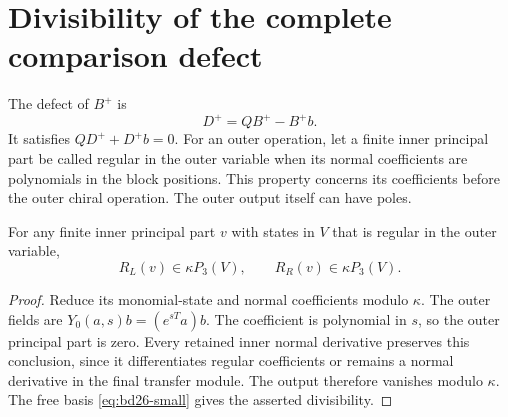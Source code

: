 \section{Divisibility of the complete comparison defect}

The defect of $B^+$ is
\[
 D^+=QB^+-B^+b.
\]
It satisfies $QD^++D^+b=0$.
For an outer operation, let a finite inner principal part be called regular in the outer variable when its normal coefficients are polynomials in the block positions.
This property concerns its coefficients before the outer chiral operation.
The outer output itself can have poles.

\begin{lemma}\label{lem:bd26-arbitrary-regular-outer}
For any finite inner principal part $v$ with states in $V$ that is regular in the outer variable,
\[
 R_L(v)\in\kappa P_3(V),\qquad R_R(v)\in\kappa P_3(V).
\]
\end{lemma}
\begin{proof}
Reduce its monomial-state and normal coefficients modulo $\kappa$.
The outer fields are $Y_0(a,s)b=(e^{sT}a)b$.
The coefficient is polynomial in $s$, so the outer principal part is zero.
Every retained inner normal derivative preserves this conclusion, since it differentiates regular coefficients or remains a normal derivative in the final transfer module.
The output therefore vanishes modulo $\kappa$.
The free basis \eqref{eq:bd26-small} gives the asserted divisibility.
\end{proof}

